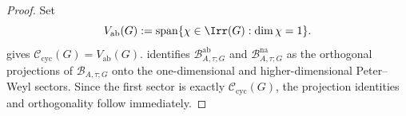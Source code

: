 \begin{proof}
  Set
  \[
    V_{\mathrm{ab}}(G)
    :=
    \operatorname{span}\{\chi\in\Irr(G):\dim\chi=1\}.
  \]
   gives
  \(\mathscr C_{\mathrm{cyc}}(G)=V_{\mathrm{ab}}(G)\).
   identifies
  \(\mathcal B_{A,\tau;G}^{\mathrm{ab}}\) and \(\mathcal B_{A,\tau;G}^{\mathrm{na}}\) as
  the orthogonal projections of \(\mathcal B_{A,\tau;G}\) onto the
  one-dimensional and higher-dimensional Peter--Weyl sectors. Since the
  first sector is exactly \(\mathscr C_{\mathrm{cyc}}(G)\), the
  projection identities and orthogonality follow immediately.
\end{proof}

